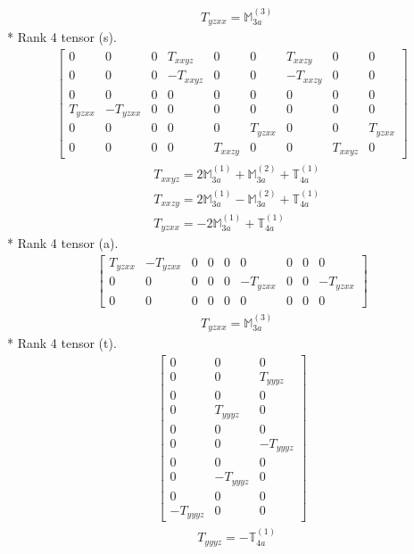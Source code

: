 \documentclass[fleqn,8pt,landscape]{jsarticle}
\begin{document}
\begin{align*}
& T_{yzxx} = \mathbb{M}_{3a}^{(3)}
\end{align*}
* Rank 4 tensor (s).
\begin{align*}
\begin{bmatrix} 0 & 0 & 0 & T_{xxyz} & 0 & 0 & T_{xxzy} & 0 & 0 \\ 0 & 0 & 0 & - T_{xxyz} & 0 & 0 & - T_{xxzy} & 0 & 0 \\ 0 & 0 & 0 & 0 & 0 & 0 & 0 & 0 & 0 \\ T_{yzxx} & - T_{yzxx} & 0 & 0 & 0 & 0 & 0 & 0 & 0 \\ 0 & 0 & 0 & 0 & 0 & T_{yzxx} & 0 & 0 & T_{yzxx} \\ 0 & 0 & 0 & 0 & T_{xxzy} & 0 & 0 & T_{xxyz} & 0 \end{bmatrix}
\end{align*}
\begin{align*}
& T_{xxyz} = 2 \mathbb{M}_{3a}^{(1)} + \mathbb{M}_{3a}^{(2)} + \mathbb{T}_{4a}^{(1)} \\
& T_{xxzy} = 2 \mathbb{M}_{3a}^{(1)} - \mathbb{M}_{3a}^{(2)} + \mathbb{T}_{4a}^{(1)} \\
& T_{yzxx} = - 2 \mathbb{M}_{3a}^{(1)} + \mathbb{T}_{4a}^{(1)}
\end{align*}
* Rank 4 tensor (a).
\begin{align*}
\begin{bmatrix} T_{yzxx} & - T_{yzxx} & 0 & 0 & 0 & 0 & 0 & 0 & 0 \\ 0 & 0 & 0 & 0 & 0 & - T_{yzxx} & 0 & 0 & - T_{yzxx} \\ 0 & 0 & 0 & 0 & 0 & 0 & 0 & 0 & 0 \end{bmatrix}
\end{align*}
\begin{align*}
& T_{yzxx} = \mathbb{M}_{3a}^{(3)}
\end{align*}
* Rank 4 tensor (t).
\begin{align*}
\begin{bmatrix} 0 & 0 & 0 \\ 0 & 0 & T_{yyyz} \\ 0 & 0 & 0 \\ 0 & T_{yyyz} & 0 \\ 0 & 0 & 0 \\ 0 & 0 & - T_{yyyz} \\ 0 & 0 & 0 \\ 0 & - T_{yyyz} & 0 \\ 0 & 0 & 0 \\ - T_{yyyz} & 0 & 0 \end{bmatrix}
\end{align*}
\begin{align*}
& T_{yyyz} = - \mathbb{T}_{4a}^{(1)}
\end{align*}
\end{document}
